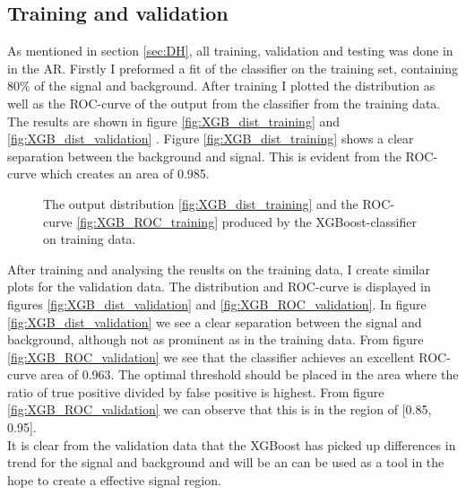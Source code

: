 \documentclass{article}
\begin{document}
\subsection{Training and validation}\label{subsec:training}
As mentioned in section \ref{sec:DH}, all training, validation and testing was done in in the AR. Firstly I preformed a fit of the classifier on the training set, containing $80\%$ of the signal and background. After training I plotted the distribution as well as the ROC-curve of the output from the classifier from the training data. The results are shown in figure \ref{fig:XGB_dist_training} and \ref{fig:XGB_dist_validation} . Figure \ref{fig:XGB_dist_training} shows a clear separation between the background and signal. This is evident from the ROC-curve which creates an area of 0.985. 
\begin{figure}
    \caption{The output distribution \ref{fig:XGB_dist_training} and the ROC-curve \ref{fig:XGB_ROC_training} produced by the XGBoost-classifier on training data. }
\end{figure}
\newline
After training and analysing the reuslts on the training data, I create similar plots for the validation data. The distribution and ROC-curve is displayed in figures \ref{fig:XGB_dist_validation}
and \ref{fig:XGB_ROC_validation}. In figure \ref{fig:XGB_dist_validation} we see a clear separation between the signal and background, although not as prominent as in the training data. From figure \ref{fig:XGB_ROC_validation} we see that the classifier achieves an excellent ROC-curve area of 0.963. The optimal threshold should be placed in the area where the ratio of true positive divided by false positive is highest. From figure \ref{fig:XGB_ROC_validation} we can observe that this is in the region of [0.85, 0.95].
\\
It is clear from the validation data that the XGBoost has picked up differences in trend for the signal and background and will be an can be used as a tool in the hope to create a effective signal region. 
\end{document}
